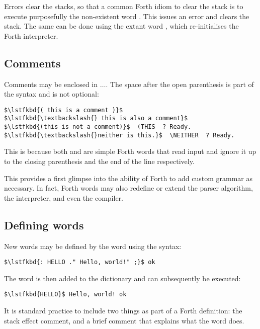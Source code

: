 Errors clear the stacks, so that a common Forth idiom to clear the stack is to
execute purposefully the non-existent word . This issues an error and
clears the stack. The same can be done using the extant word , which
re-initialises the Forth interpreter.


\subsection{Comments}

Comments may be enclosed in \cftin{(\space}$\dots$\cftin{\space)}. The space
after the open parenthesis is part of the syntax and is not optional:

\begin{lstlisting}[mathescape=true,numbers=none]
$\lstfkbd{( this is a comment )}$
$\lstfkbd{\textbackslash{} this is also a comment}$
$\lstfkbd{(this is not a comment)}$  (THIS  ? Ready.
$\lstfkbd{\textbackslash{}neither is this.}$  \NEITHER  ? Ready.
\end{lstlisting}

\noindent This is because both \fw{(} and \fw{\textbackslash} are simple Forth words that
read input and ignore it up to the closing parenthesis and the end of the line
respectively.

This provides a first glimpse into the ability of Forth to add custom grammar
as necessary. In fact, Forth words may also redefine or extend the parser
algorithm, the interpreter, and even the compiler.

\subsection{Defining words}

New words may be defined by the \fw{:} word using the  syntax:

\begin{lstlisting}[mathescape=true,numbers=none]
$\lstfkbd{: HELLO ." Hello, world!" ;}$ ok
\end{lstlisting}

\noindent The word  is then added to the dictionary and can subsequently be
executed:

\begin{lstlisting}[mathescape=true,numbers=none]
$\lstfkbd{HELLO}$ Hello, world! ok
\end{lstlisting}

\noindent It is standard practice to include two things as part of a Forth definition:
the \gls{stack effect comment}, and a brief comment that explains what the word does. 

